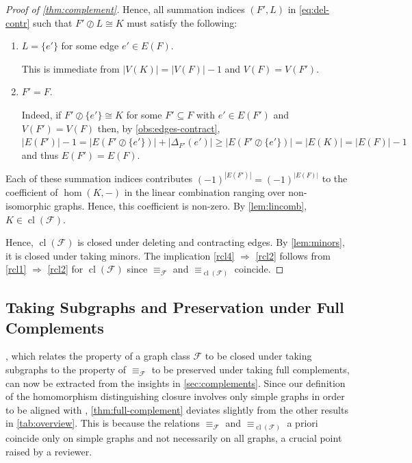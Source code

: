 \documentclass[3p,final]{elsarticle}
\DeclareMathOperator{\cl}{cl}
\begin{document}
\begin{proof}[Proof of \cref{thm:complement}]
		Hence, all summation indices $(F', L)$ in \cref{eq:del-contr} such that $F' \oslash L \cong K$ must satisfy the following:
		\begin{enumerate}
			\item $L = \{e'\}$ for some edge $e' \in E(F)$.
			
			This is immediate from $|V(K)| = |V(F)| - 1$ and $V(F) = V(F')$.
			\item $F' = F$. 
			
			Indeed, if $F' \oslash \{e'\} \cong K$ for some $F' \subseteq F$ with $e' \in E(F')$ and $V(F') = V(F)$
			then, by \cref{obs:edges-contract},
			$|E(F')| - 1 = |E(F' \oslash \{e'\})| + |\Delta_{F'}(e')| \geq
			|E(F' \oslash \{e'\})| = |E(K)| =  |E(F)| - 1$ and thus $E(F') = E(F)$.
		\end{enumerate}
		Each of these summation indices contributes $(-1)^{|E(F')|} = (-1)^{|E(F)|}$ to the coefficient of $\hom(K, -)$ in the linear combination ranging over non-isomorphic graphs.
		Hence, this coefficient is non-zero.
		By \cref{lem:lincomb}, $K \in \cl(\mathcal{F})$.
		
		Hence, $\cl(\mathcal{F})$ is closed under deleting and contracting edges. By \cref{lem:minors}, it is closed under taking minors.
		The implication \ref{rcl4} $\Rightarrow$ \ref{rcl2} follows from \ref{rcl1} $\Rightarrow$ \ref{rcl2} for $\cl(\mathcal{F})$ since $\equiv_{\mathcal{F}}$ and $\equiv_{\cl(\mathcal{F})}$ coincide.
	\end{proof}
	
	
	\subsection{Taking Subgraphs and Preservation under Full Complements}
	\label{sec:full-complements}
	
	, which relates the property of a graph class $\mathcal{F}$ to be closed under taking subgraphs to the property of $\equiv_{\mathcal{F}}$ to be preserved under taking full complements,
	can now be extracted from the insights in \cref{sec:complements}.
	Since our definition of the homomorphism distinguishing closure involves only simple graphs in order to be aligned with \cite{roberson_oddomorphisms_2022}, \cref{thm:full-complement} deviates slightly from the other results in \cref{tab:overview}.
	This is because the relations $\equiv_{\mathcal{F}}$ and $\equiv_{\cl(\mathcal{F})}$ a priori coincide only on simple graphs and not necessarily on all graphs, a crucial point raised by a reviewer.
	
\end{document}
